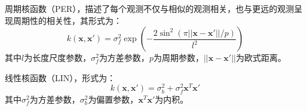 \documentclass[final]{cvpr}
\begin{document}
周期核函数（PER）\cite{hendriks2018evaluating}，描述了每个观测不仅与相似的观测相关，也与更远的观测呈现周期性的相关性，其形式为：
\begin{equation}
    k(\boldsymbol{x},\boldsymbol{x}')=\sigma_f^2\exp\left(-\frac{2\sin^2(\pi||\boldsymbol{x}-\boldsymbol{x}'||/p)}{l^2}\right)
\end{equation}
其中$l$为长度尺度参数，$\sigma_f^2$为方差参数，$p$为周期参数，$||\boldsymbol{x}-\boldsymbol{x}'||$为欧式距离。

线性核函数（LIN）\cite{kamperis_introduction_2021}，形式为：
\begin{equation}
    k(\boldsymbol{x},\boldsymbol{x}')=\sigma_b^2+\sigma_f^2\boldsymbol{x}^T\boldsymbol{x}'
\end{equation}
其中$\sigma_f^2$为方差参数，$\sigma_b^2$为偏置参数，$\boldsymbol{x}^T\boldsymbol{x}'$为内积。


\end{document}
